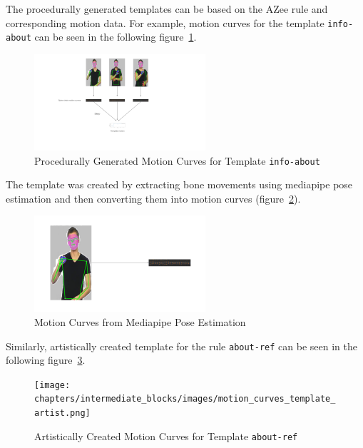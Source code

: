 \documentclass[../../main.tex]{subfiles}
\begin{document}
The procedurally generated templates can be based on the AZee rule and corresponding motion data. For example, motion curves for the template \texttt{info-about} can be seen in the following figure~\ref{fig:motion_curves_template_procedural}.

\begin{figure}
    \centering \includegraphics[width = 2.5in]{chapters/intermediate_blocks/images/motion_curves_template_procedural.png}
    \caption{Procedurally Generated Motion Curves for Template \texttt{info-about}}
    \label{fig:motion_curves_template_procedural}
\end{figure}

The template was created by extracting bone movements using mediapipe pose estimation and then converting them into motion curves (figure~\ref{fig:motion_curves_mediapipe}).

\begin{figure}
    \centering \includegraphics[width = 2.5in]{chapters/intermediate_blocks/images/motion_curves_mediapipe.png}
    \caption{Motion Curves from Mediapipe Pose Estimation}
    \label{fig:motion_curves_mediapipe}
\end{figure}

Similarly, artistically created template for the rule \texttt{about-ref} can be seen in the following figure~\ref{fig:motion_curves_template_artist}.

\begin{figure}
    \centering \texttt{[image: chapters/intermediate\_blocks/images/motion\_curves\_template\_artist.png]}
    \caption{Artistically Created Motion Curves for Template \texttt{about-ref}}
    \label{fig:motion_curves_template_artist}
\end{figure}
\end{document}
